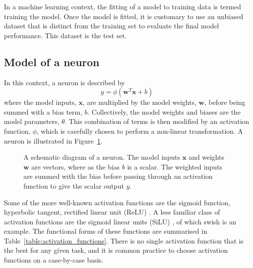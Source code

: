 \documentclass[main.tex]{subfiles}
\begin{document}
    In a machine learning context, the fitting of a
    model to training data is termed training the model.
    Once the model is fitted, it is customary to use
    an unbiased dataset that is distinct from the training set
    to evaluate the final model performance. This dataset is
    the test set.

\subsection{Model of a neuron}
    In this context, a neuron is described by
    \begin{equation}\label{eqn:neuron}
        y = \phi(\mathbf{w}^{T}\mathbf{x} + b)
    \end{equation}
    where the model inputs, $\mathbf{x}$, are multiplied
    by the model weights, $\mathbf{w}$, before being summed
    with a bias term, $b$. Collectively, the model weights
    and biases are the model parameters, $\theta$.
    This combination of terms is then modified
    by an activation function, $\phi$, which is carefully
    chosen to perform a non-linear transformation. A neuron
    is illustrated in Figure~\ref{fig:neuron}.
    
    \begin{figure}
        \caption{A schematic diagram of a neuron. The model inputs
        $\mathbf{x}$ and weights $\mathbf{w}$ are vectors, where as
        the bias $b$ is a scalar. The weighted inputs are summed with
        the bias before passing through an activation function
        to give the scalar output $y$.}
        \label{fig:neuron}
    \end{figure}
    
    Some of the more well-known activation functions are
    the sigmoid function, hyperbolic tangent, rectified linear unit (ReLU) \cite{Nair2010RectifiedLU}.
    A less familiar class of activation functions are the
    sigmoid linear units (SiLU) \cite{Hendrycks2016BridgingNA},
    of which swish \cite{DBLP:journals/corr/abs-1710-05941} is an example.
    The functional forms of these
    functions are summarised in Table~\ref{table:activation_functions}.
    There is no single activation function that is the best
    for any given task, and it is common practice to choose activation
    functions on a case-by-case basis.
\end{document}
